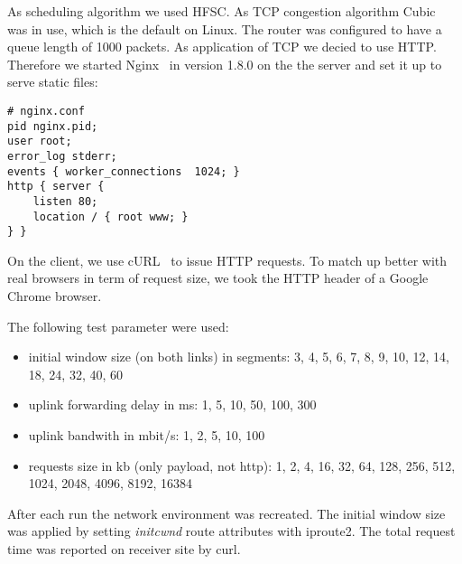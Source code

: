 As scheduling algorithm we used HFSC. As TCP congestion algorithm
Cubic~\cite{cubic} was in use, which is the default on Linux. The router was
configured to have a queue length of 1000 packets. As application of TCP we
decied to use HTTP. Therefore we started Nginx~\cite{nginx} in version 1.8.0 on
the the server and set it up to serve static files:

\begin{lstlisting}
# nginx.conf
pid nginx.pid;
user root;
error_log stderr;
events { worker_connections  1024; }
http { server {
    listen 80;
    location / { root www; }
} }
\end{lstlisting}

On the client, we use cURL~\cite{curl} to issue HTTP requests. To match up
better with real browsers in term of request size, we took the HTTP header of a
Google Chrome browser.

The following test parameter were used:

\begin{itemize}
  \item initial window size (on both links) in segments: 3, 4, 5, 6, 7, 8, 9, 10, 12, 14, 18, 24, 32, 40, 60
  \item uplink forwarding delay in ms: 1, 5, 10, 50, 100, 300
  \item uplink bandwith in mbit/s: 1, 2, 5, 10, 100
  \item requests size in kb (only payload, not http): 1, 2, 4, 16, 32, 64, 128, 256, 512, 1024, 2048, 4096, 8192, 16384
\end{itemize}

After each run the network environment was recreated. The initial window size
was applied by setting \emph{initcwnd} route attributes with iproute2. The total
request time was reported on receiver site by curl.
